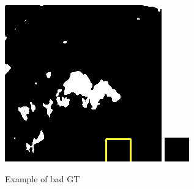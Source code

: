 \documentclass[UTF8]{ctexart}
\begin{document}
\begin{figure}[H]
{\begin{minipage}[b]{0.15\linewidth}
            \vspace{4pt}
            \includegraphics[width=1\linewidth]{../log/cut/LC81570452014213LGN00_06157_unet.jpg}\vspace{4pt}
            \includegraphics[width=1\linewidth]{../log/cut/tmp_cut_LC81570452014213LGN00_06157_unet.jpg}
        \end{minipage}
    }

\caption{Example of bad GT}
\label{Fig.main2}
\end{figure}
\end{document}
